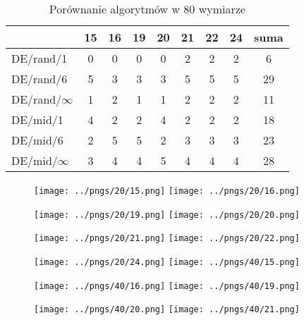 \documentclass[12pt, a4paper]{article}
\begin{document}
\begin{table}[H]
\centering
\begin{tabular}{ l | c | c | c | c | c | c | c | c}
                 & 15 & 16 & 19 & 20 & 21 & 22 & 24 & suma \\ \hline
DE/rand/1        & 0  & 0  & 0  & 0  & 2  & 2  & 2  & 6    \\ 
DE/rand/6        & 5  & 3  & 3  & 3  & 5  & 5  & 5  & 29   \\ 
DE/rand/$\infty$ & 1  & 2  & 1  & 1  & 2  & 2  & 2  & 11   \\ 
DE/mid/1         & 4  & 2  & 2  & 4  & 2  & 2  & 2  & 18   \\
DE/mid/6         & 2  & 5  & 5  & 2  & 3  & 3  & 3  & 23   \\ 
DE/mid/$\infty$  & 3  & 4  & 4  & 5  & 4  & 4  & 4  & 28   \\
\end{tabular}
\caption{Porównanie algorytmów w 80 wymiarze}
\label{table:80d}
\end{table}


\begin{figure}
\centering
\texttt{[image: ../pngs/20/15.png]} 
\texttt{[image: ../pngs/20/16.png]}
\end{figure}

\begin{figure}
\centering
\texttt{[image: ../pngs/20/19.png]} 
\texttt{[image: ../pngs/20/20.png]}
\end{figure}

\begin{figure}
\centering
\texttt{[image: ../pngs/20/21.png]} 
\texttt{[image: ../pngs/20/22.png]}
\end{figure}

\begin{figure}
\centering
\texttt{[image: ../pngs/20/24.png]} 
\texttt{[image: ../pngs/40/15.png]} 
\end{figure}

\begin{figure}
\centering
\texttt{[image: ../pngs/40/16.png]} 
\texttt{[image: ../pngs/40/19.png]} 
\end{figure}

\begin{figure}
\centering
\texttt{[image: ../pngs/40/20.png]} 
\texttt{[image: ../pngs/40/21.png]} 
\end{figure}
\end{document}
